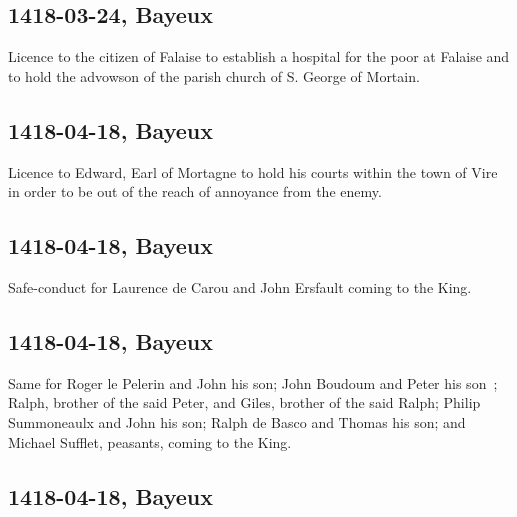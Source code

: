 \documentclass[a4paper,12pt,twoside]{book}
\begin{document}
                
                \subsection{1418-03-24, Bayeux}
                
                
                     Licence to the citizen of Falaise to establish a hospital for the poor at Falaise and to hold the advowson of the parish church of S. George of Mortain.
                  
                
                \subsection{1418-04-18, Bayeux}
                
                
                     Licence to Edward, Earl of Mortagne to hold his courts within the town of Vire in order to be out of the reach of annoyance from the enemy.
                  
                
                \subsection{1418-04-18, Bayeux}
                
                
                     Safe-conduct for Laurence de Carou and John Ersfault coming to the King.
                  
                
                \subsection{1418-04-18, Bayeux}
                
                
                     Same for Roger le Pelerin and John his son; John Boudoum and Peter his son ; Ralph, brother of the said Peter, and Giles, brother of the said Ralph; Philip Summoneaulx and John his son; Ralph de Basco and Thomas his son; and Michael Sufflet, peasants, coming to the King.
                  
                
                \subsection{1418-04-18, Bayeux}
                
\end{document}
